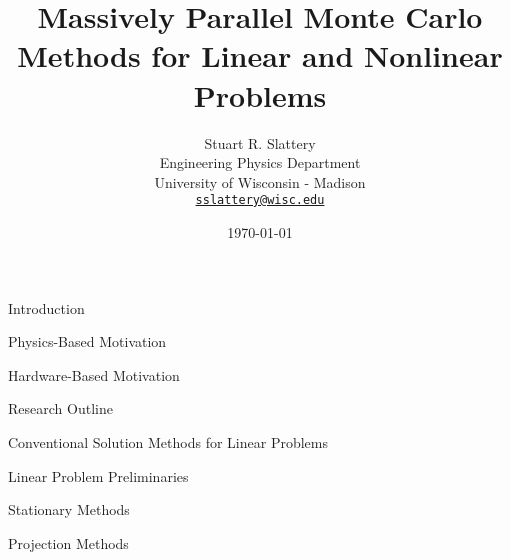 \documentclass{beamer}
\author{Stuart R. Slattery
  \\ Engineering Physics Department
  \\ University of Wisconsin - Madison
  \\ \href{mailto:sslattery@wisc.edu}{\texttt{sslattery@wisc.edu}}
}
\date{\today}
\title{Massively Parallel Monte Carlo Methods for Linear and Nonlinear
Problems}
\begin{document}
\maketitle


\begin{frame}{Introduction}

\end{frame}

\begin{frame}{Physics-Based Motivation}

\end{frame}

\begin{frame}{Hardware-Based Motivation}

\end{frame}

\begin{frame}{Research Outline}

\end{frame}

\begin{frame}{Conventional Solution Methods for Linear Problems}

\end{frame}

\begin{frame}{Linear Problem Preliminaries}

\end{frame}

\begin{frame}{Stationary Methods}

\end{frame}

\begin{frame}{Projection Methods}

\end{frame}
\end{document}
